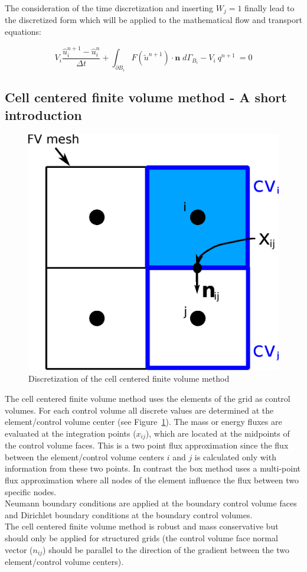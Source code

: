 The consideration of the time discretization and inserting $W_j = 1$ finally lead to the discretized form which will be applied to the mathematical flow and transport equations:

\begin{equation}
\label{eq:discfin} 
	V_i \frac{\hat u_i^{n+1} - \hat u_i^{n}}{\Delta t} + \int_{\partial B_i}  F(\tilde u^{n+1}) \cdot \mathbf n  \;  d{\varGamma}_{B_i} - V_i \: q^{n+1} \: = 0 
\end{equation}

\subsection{Cell centered finite volume method - A short introduction}\label{cc}

\begin{figure} [h]
\centering
\includegraphics[width=0.4\linewidth,keepaspectratio]{EPS/cc_disc}
\caption{\label{pc:cc} Discretization of the cell centered finite volume method}
\end{figure}

The cell centered finite volume method uses the elements of the grid as control volumes. 
For each control volume all discrete values are determined at the element/control volume center (see Figure~\ref{pc:cc}). 
The mass or energy fluxes are evaluated at the integration points ($x_{ij}$), which are located at the midpoints of the control 
volume faces. This is a two point flux approximation since the flux between the element/control volume centers $i$ and $j$ is calculated
only with information from these two points. In contrast the box method uses a multi-point flux approximation where all nodes of the 
element influence the flux between two specific nodes. \\
Neumann boundary conditions are applied at the boundary control volume faces and Dirichlet boundary conditions at the boundary control volumes. \\
The cell centered finite volume method is robust and mass conservative but should only be applied for structured grids 
(the control volume face normal vector ($n_{ij}$) should be parallel to the direction of the gradient between the two element/control 
volume centers). 

